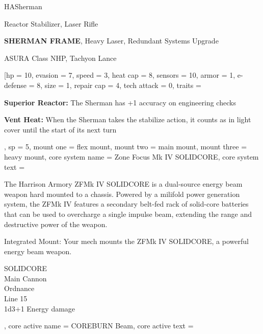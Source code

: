 \begin{mech}{HA}{Sherman}


\begin{license}
\item Reactor Stabilizer, Laser Rifle
\item \textbf{SHERMAN FRAME}, Heavy Laser, Redundant Systems Upgrade
\item ASURA Class NHP, Tachyon Lance
\end{license}

\frameBox
[hp = 10,
evasion = 7,
speed = 3,
heat cap = 8,
sensors = 10,
armor = 1,
e-defense = 8,
size = 1,
repair cap = 4,
tech attack = 0,
traits = {\textbf{Superior Reactor:} The Sherman has +1 accuracy on engineering checks

\textbf{Vent Heat:} When the Sherman takes the stabilize action, it counts as in light cover until the start of its next turn},
sp = 5,
mount one = flex mount,
mount two = main mount,
mount three = heavy mount,
core system name = Zone Focus Mk IV  SOLIDCORE,
core system text ={The Harrison Armory ZFMk IV SOLIDCORE is a dual-source energy beam weapon hard mounted to a chassis. Powered by a milifold power generation system, the ZFMk IV features a secondary belt-fed rack of solid-core batteries that can be used to overcharge a single impulse beam, extending the range and destructive power of the weapon.

Integrated Mount: Your mech mounts the ZFMk IV SOLIDCORE, a powerful energy beam weapon.

SOLIDCORE\\
Main Cannon\\
Ordnance\\
Line 15\\
1d3+1 Energy damage},
core active name = COREBURN Beam,
core active text = {\FullAction

}
\end{mech}
